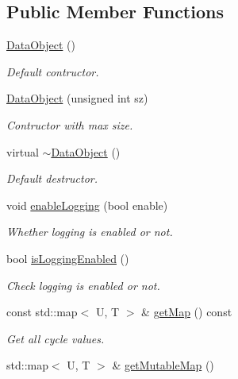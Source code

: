 \subsection*{\-Public \-Member \-Functions}
\begin{DoxyCompactItemize}
\item 
\hyperlink{classcryomesh_1_1dataobjects_1_1DataObject_a8be8493ecc93482b2ab10dc8c0a93440}{\-Data\-Object} ()
\begin{DoxyCompactList}\small\item\em \-Default contructor. \end{DoxyCompactList}\item 
\hyperlink{classcryomesh_1_1dataobjects_1_1DataObject_aff5302c3c41e16d4cc828d2bc3658cda}{\-Data\-Object} (unsigned int sz)
\begin{DoxyCompactList}\small\item\em \-Contructor with max size. \end{DoxyCompactList}\item 
virtual \hyperlink{classcryomesh_1_1dataobjects_1_1DataObject_a5542785b10e905eae83370406126830d}{$\sim$\-Data\-Object} ()
\begin{DoxyCompactList}\small\item\em \-Default destructor. \end{DoxyCompactList}\item 
void \hyperlink{classcryomesh_1_1dataobjects_1_1DataObject_a82e70f55cf4bff3c139a7aeaad4fc475}{enable\-Logging} (bool enable)
\begin{DoxyCompactList}\small\item\em \-Whether logging is enabled or not. \end{DoxyCompactList}\item 
bool \hyperlink{classcryomesh_1_1dataobjects_1_1DataObject_ac47906fb6abbb0e655e143b604255785}{is\-Logging\-Enabled} ()
\begin{DoxyCompactList}\small\item\em \-Check logging is enabled or not. \end{DoxyCompactList}\item 
const std\-::map$<$ \-U, \-T $>$ \& \hyperlink{classcryomesh_1_1dataobjects_1_1DataObject_a7b940ad5f397713567877b5295094fdd}{get\-Map} () const 
\begin{DoxyCompactList}\small\item\em \-Get all cycle values. \end{DoxyCompactList}\item 
std\-::map$<$ \-U, \-T $>$ \& \hyperlink{classcryomesh_1_1dataobjects_1_1DataObject_a52fe0b6b4106762a553875406ebd7023}{get\-Mutable\-Map} ()

\end{DoxyCompactItemize}
